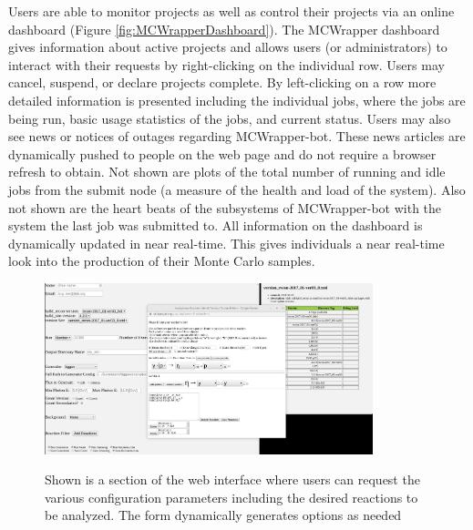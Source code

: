 Users are able to monitor projects as well as control their projects via an online dashboard (Figure \ref{fig:MCWrapperDashboard}).  The MCWrapper dashboard gives information about active projects and allows users (or administrators) to interact with their requests by right-clicking on the individual row.  Users may cancel, suspend, or declare projects complete. By left-clicking on a row more detailed information is presented including the individual jobs, where the jobs are being run, basic usage statistics of the jobs, and current status.  Users may also see news or notices of outages regarding MCWrapper-bot.  These news articles are dynamically pushed to people on the web page and do not require a browser refresh to obtain.  Not shown are plots of the total number of running and idle jobs from the submit node (a measure of the health and load of the system). Also not shown are the heart beats of the subsystems of MCWrapper-bot with the system the last job was submitted to.  All information on the dashboard is dynamically updated in near real-time.  This gives individuals a near real-time look into the production of their Monte Carlo samples.
\begin{figure}[h!]\centering
\includegraphics[width=0.85\textwidth]{figures/mcwrapper_submit_form.png}
\caption{Shown is a section of the web interface where users can request the various configuration parameters including the desired reactions to be analyzed.  The form dynamically generates options as needed}{\label{fig:MCWrapperSubmit}}
\end{figure}
